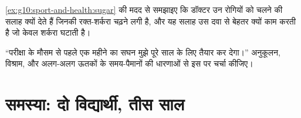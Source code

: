 \begin{exercise}[$\star\star\star$]\label{exo:g10:sport-and-health:14}
\cref{ex:g10:sport-and-health:sugar} की मदद से समझाइए कि डॉक्टर उन
रोगियों को चलने की सलाह क्यों देते हैं जिनकी रक्त-शर्करा चढ़ने लगी है,
और यह सलाह उस दवा से बेहतर क्यों काम करती है जो केवल शर्करा घटाती है।
\end{exercise}

\begin{exercise}[$\star\star\star$]\label{exo:g10:sport-and-health:15}
``परीक्षा के मौसम से पहले एक महीने का सघन  मुझे पूरे साल के लिए
तैयार कर देगा।'' अनुकूलन, विश्राम, और अलग-अलग ऊतकों के समय-पैमानों की
धारणाओं से इस पर चर्चा कीजिए।
\end{exercise}

\section{समस्या: दो विद्यार्थी, तीस साल}

